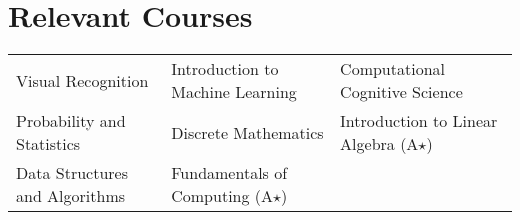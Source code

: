 \section*{Relevant Courses}
\begin{tabularx}{\textwidth}{X X X}
    Visual Recognition &
    Introduction to Machine Learning &
    Computational Cognitive Science \\
    Probability and Statistics &
    Discrete Mathematics &
    Introduction to Linear Algebra (A$\star$) \\
    Data Structures and Algorithms &
    Fundamentals of Computing (A$\star$) &
\end{tabularx}
